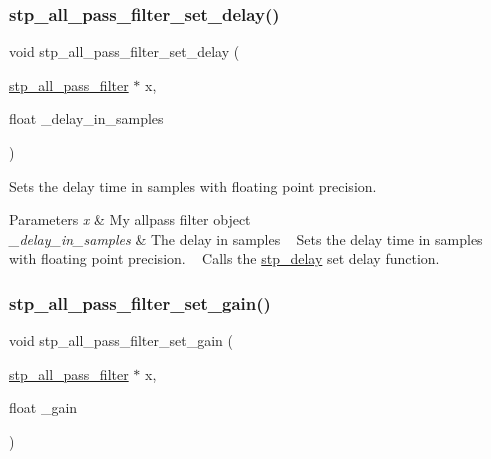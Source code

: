 \subsubsection{\texorpdfstring{stp\+\_\+all\+\_\+pass\+\_\+filter\+\_\+set\+\_\+delay()}{stp\_all\_pass\_filter\_set\_delay()}}
{\footnotesize\ttfamily void stp\+\_\+all\+\_\+pass\+\_\+filter\+\_\+set\+\_\+delay (\begin{DoxyParamCaption}\item[{\hyperlink{structstp__all__pass__filter}{stp\+\_\+all\+\_\+pass\+\_\+filter} $\ast$}]{x,  }\item[{float}]{\+\_\+delay\+\_\+in\+\_\+samples }\end{DoxyParamCaption})\hspace{0.3cm}{\ttfamily [related]}}



Sets the delay time in samples with floating point precision. ~\newline
 


\begin{DoxyParams}{Parameters}
{\em x} & My allpass filter object ~\newline
 \\
\hline
{\em \+\_\+delay\+\_\+in\+\_\+samples} & The delay in samples ~\newline
 Sets the delay time in samples with floating point precision. ~\newline
 Calls the \hyperlink{structstp__delay}{stp\+\_\+delay} set delay function. ~\newline
 \\
\hline
\end{DoxyParams}
\mbox{\label{structstp__all__pass__filter_ab4e461c65b5eaabdf3256386645ebbc5}} 
\subsubsection{\texorpdfstring{stp\+\_\+all\+\_\+pass\+\_\+filter\+\_\+set\+\_\+gain()}{stp\_all\_pass\_filter\_set\_gain()}}
{\footnotesize\ttfamily void stp\+\_\+all\+\_\+pass\+\_\+filter\+\_\+set\+\_\+gain (\begin{DoxyParamCaption}\item[{\hyperlink{structstp__all__pass__filter}{stp\+\_\+all\+\_\+pass\+\_\+filter} $\ast$}]{x,  }\item[{float}]{\+\_\+gain }\end{DoxyParamCaption})\hspace{0.3cm}{\ttfamily [related]}}



